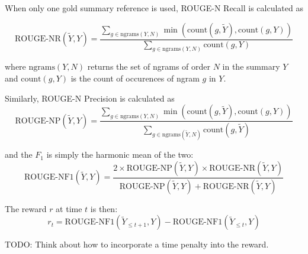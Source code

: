 \documentclass[12pt]{article}
\begin{document}
     
    When only one gold summary reference is used, ROUGE-N Recall is calculated
    as 

    \[ \textrm{ROUGE-NR}(\tilde{Y}, Y) = 
        \frac{\sum_{g \in \textrm{ngrams}(Y,N)} 
        \min \left(\textrm{count}(g, \tilde{Y}), \textrm{count}(g, Y)\right)}{
        \sum_{g \in \textrm{ngrams}(Y,N)} 
        \textrm{count}(g, Y)
        }
    \]

    where $\textrm{ngrams}(Y, N)$ returns the set of ngrams of order $N$ in 
    the summary $Y$ and $\textrm{count}(g, Y)$ is the count of occurences of
    ngram $g$ in $Y.$

    Similarly, ROUGE-N Precision is calculated as 
    \[ \textrm{ROUGE-NP}(\tilde{Y}, Y) = 
        \frac{\sum_{g \in \textrm{ngrams}(Y,N)} 
        \min \left(\textrm{count}(g, \tilde{Y}), \textrm{count}(g, Y)\right)}{
            \sum_{g \in \textrm{ngrams}(\tilde{Y},N)} 
            \textrm{count}(g, \tilde{Y})
        }
    \]

    and the $F_1$ is simply the harmonic mean of the two:
    \[ \textrm{ROUGE-NF1}(\tilde{Y}, Y) = \frac{ 2 \times 
    \textrm{ROUGE-NP}(\tilde{Y}, Y) \times \textrm{ROUGE-NR}(\tilde{Y}, Y)
    }{ \textrm{ROUGE-NP}(\tilde{Y}, Y) + \textrm{ROUGE-NR}(\tilde{Y}, Y) } \]
        


    The reward $r$ at time $t$ is then:
    \[ r_t = \textrm{ROUGE-NF1}(\tilde{Y}_{\le t+1}, Y) - 
    \textrm{ROUGE-NF1}(\tilde{Y}_{\le t}, Y) \]

    TODO: Think about how to incorporate a time penalty into the reward.

\center
\end{document}
